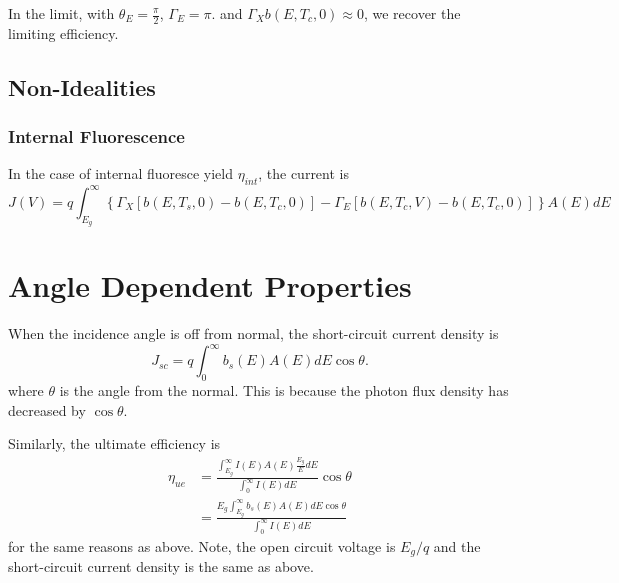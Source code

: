 \documentclass[12pt]{article}
\begin{document}
In the limit, with $\theta_E = \frac{\pi}{2}$, $\Gamma_E = \pi$.   
and $\Gamma_X b(E, T_c, 0) \approx 0$, we recover the limiting efficiency.    

\subsection{Non-Idealities}


\subsubsection{Internal Fluorescence}

In the case of internal fluoresce yield $\eta_{int}$, the current is
\begin{equation}
J(V) = q \int_{E_g}^{\infty} \left \{ \Gamma_X \left [ b (E, T_s,0) - b(E, T_c, 0) \right ] - \Gamma_E  \left [ b(E, T_c, V)  - b(E, T_c, 0) \right ]  \right \} A(E) dE
\end{equation}





\section{Angle Dependent Properties}

When the incidence angle is off from normal, the short-circuit current density is 
\begin{equation}
J_{sc} = q \int_{0}^{\infty} b_s(E) A(E) dE \cos \theta.
\end{equation}
where $\theta$ is the angle from the normal.  
This is because the photon flux density has decreased by $\cos \theta$.

Similarly, the ultimate efficiency is 
\begin{equation}
\begin{aligned}
\eta_{ue} &= \frac{\int_{E_g}^{\infty} I(E) A(E) \frac{E_g}{E} dE}{\int_{0}^{\infty} I(E) dE} \cos \theta\\
&= \frac{ E_g  \int_{E_g}^{\infty} b_s(E) A(E) dE \cos \theta}{\int_{0}^{\infty} I(E) dE} 
\end{aligned}
\end{equation}
for the same reasons as above.  Note, the open circuit voltage is $E_g/q$ and the short-circuit current density is the same as above.  
\end{document}
